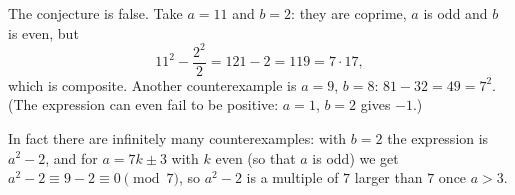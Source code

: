 The conjecture is false. Take $a=11$ and $b=2$: they are coprime, $a$ is odd and $b$ is even, but
\[
11^2-\dfrac{2^2}{2}=121-2=\boxed{119=7\cdot17},
\]
which is composite. Another counterexample is $a=9$, $b=8$: $81-32=49=7^2$. (The expression can even fail to be positive: $a=1$, $b=2$ gives $-1$.)

In fact there are infinitely many counterexamples: with $b=2$ the expression is $a^2-2$, and for $a=7k\pm3$ with $k$ even (so that $a$ is odd) we get $a^2-2\equiv9-2\equiv0\pmod7$, so $a^2-2$ is a multiple of $7$ larger than $7$ once $a>3$.

